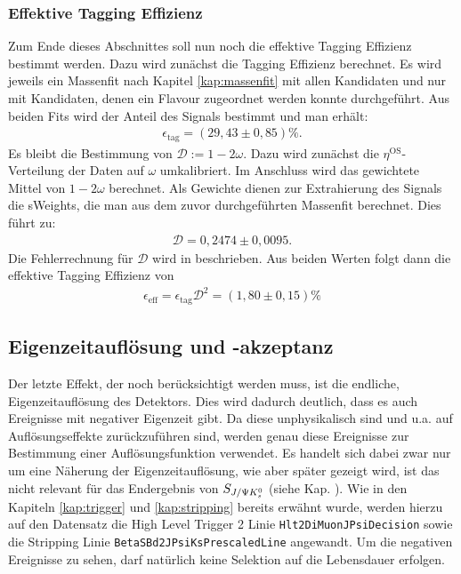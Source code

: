 \subsubsection{Effektive Tagging Effizienz}
Zum Ende dieses Abschnittes soll nun noch die effektive Tagging Effizienz bestimmt werden. Dazu wird zunächst die Tagging Effizienz berechnet. Es wird jeweils ein Massenfit nach Kapitel \ref{kap:massenfit} mit allen Kandidaten und nur mit Kandidaten, denen ein Flavour zugeordnet werden konnte durchgeführt. Aus beiden Fits wird der Anteil des Signals bestimmt und man erhält:
\begin{align}
\epsilon_{\text{tag}} = (29,43\pm 0,85)\%.
\end{align}
Es bleibt die Bestimmung von $\mathcal{D}:=1-2\omega$. Dazu wird zunächst die $\eta^{\text{OS}}$-Verteilung der Daten auf $\omega$ umkalibriert. Im Anschluss wird das gewichtete Mittel von $1-2\omega$ berechnet. Als Gewichte dienen zur Extrahierung des Signals die sWeights, die man aus dem zuvor durchgeführten Massenfit berechnet. Dies führt zu:
\begin{align}
\mathcal{D} = 0,2474\pm 0,0095.
\end{align}
Die Fehlerrechnung für $\mathcal{D}$ wird in \cite{2010-analyse} beschrieben. Aus beiden Werten folgt dann die effektive Tagging Effizienz von
\begin{align}
\epsilon_{\text{eff}} = \epsilon_{\text{tag}} \mathcal{D}^2 = (1,80\pm 0,15)\%
\end{align}

\subsection{Eigenzeitauflösung und -akzeptanz}
Der letzte Effekt, der noch berücksichtigt werden muss, ist die endliche, Ei\-gen\-zeit\-auf\-lösung des Detektors. Dies wird dadurch deutlich, dass es auch Ereignisse mit negativer Eigenzeit gibt. Da diese unphysikalisch sind und u.a. auf Auflösungseffekte zurückzuführen sind, werden genau diese Ereignisse zur Bestimmung einer Auflösungsfunktion verwendet. Es handelt sich dabei zwar nur um eine Näherung der Eigenzeitauflösung, wie aber später gezeigt wird, ist das nicht relevant für das Endergebnis von $S_{J/\Psi K_s^0}$ (siehe Kap. \label{kap:aufloesung}). Wie in den Kapiteln \ref{kap:trigger} und \ref{kap:stripping} bereits erwähnt wurde, werden hierzu auf den Datensatz die High Level Trigger 2 Linie \texttt{Hlt2DiMuonJPsiDecision} sowie die Stripping Linie \texttt{BetaSBd2JPsiKsPrescaledLine} angewandt. Um die negativen Ereignisse zu sehen, darf natürlich keine Selektion auf die Lebensdauer erfolgen.

